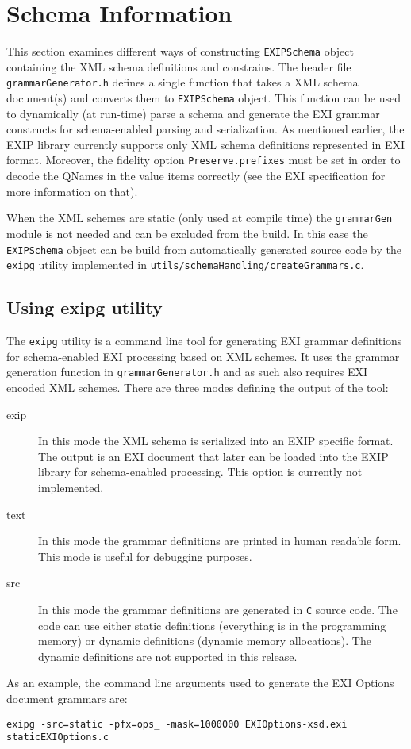 \section{Schema Information}
\label{sec:Schema-Infromation}

This section examines different ways of constructing \texttt{EXIPSchema} object
containing the XML schema definitions and constrains. The header file \texttt{grammarGenerator.h}
defines a single function that takes a XML schema document(s) and converts them to 
\texttt{EXIPSchema} object. This function can be used to dynamically (at run-time)
parse a schema and generate the EXI grammar constructs for schema-enabled
parsing and serialization. As mentioned earlier, the EXIP library currently supports
only XML schema definitions represented in EXI format. Moreover, the fidelity option \texttt{Preserve.prefixes} must be
set in order to decode the QNames in the value items correctly (see the EXI specification for
more information on that).

When the XML schemes are static (only used at
compile time) the \texttt{grammarGen} module is not needed and can be excluded from the build.
In this case the \texttt{EXIPSchema} object can be build from automatically generated source code
by the \texttt{exipg} utility implemented in \texttt{utils/schemaHandling/createGrammars.c}.

\subsection{Using exipg utility}
The \texttt{exipg} utility is a command line tool for generating EXI grammar definitions
for schema-enabled EXI processing based on XML schemes.
It uses the grammar generation
function in \texttt{grammarGenerator.h} and as such also requires EXI encoded XML schemes.
There are three modes defining the output of the tool:
\begin{description}
 \item[exip] In this mode the XML schema is serialized into an EXIP specific format. The output is
	    an EXI document that later can be loaded into the EXIP library for schema-enabled processing.
	    This option is currently not implemented.
 \item[text] In this mode the grammar definitions are printed in human readable form. This mode is
	    useful for debugging purposes.
 \item[src] In this mode the grammar definitions are generated in \texttt{C} source code. The code
	    can use either static definitions (everything is in the programming memory) or
	    dynamic definitions (dynamic memory allocations). The dynamic definitions are
	    not supported in this release.
 \end{description}
As an example, the command line arguments used to generate the EXI Options document grammars are:
\begin{lstlisting}
exipg -src=static -pfx=ops_ -mask=1000000 EXIOptions-xsd.exi staticEXIOptions.c
\end{lstlisting}

